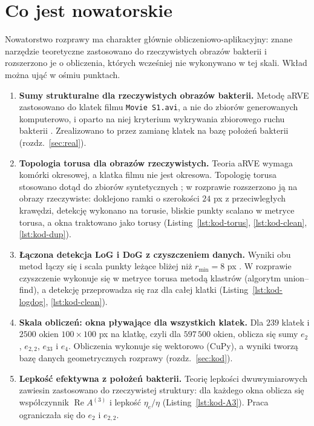 \documentclass[12pt,a4paper,twoside,openright]{report}
\theoremstyle{definition}
\theoremstyle{remark}
\renewcommand{\Re}{\operatorname{Re}}
\begin{document}
{\section{Co jest nowatorskie}
Nowatorstwo rozprawy ma charakter głównie obliczeniowo-aplikacyjny: znane narzędzie teoretyczne zastosowano do rzeczywistych obrazów bakterii i rozszerzono je o obliczenia, których wcześniej nie wykonywano w tej skali. Wkład można ująć w ośmiu punktach.
\begin{enumerate}[nosep]
\item \textbf{Sumy strukturalne dla rzeczywistych obrazów bakterii.} Metodę aRVE zastosowano do klatek filmu \texttt{Movie S1.avi}, a nie do zbiorów generowanych komputerowo, i oparto na niej kryterium wykrywania zbiorowego ruchu bakterii \cite{ligocki2024application,ligocki2025study}. Zrealizowano to przez zamianę klatek na bazę położeń bakterii (rozdz.~\ref{sec:real}).
\item \textbf{Topologia torusa dla obrazów rzeczywistych.} Teoria aRVE wymaga komórki okresowej, a klatka filmu nie jest okresowa. Topologię torusa stosowano dotąd do zbiorów syntetycznych \cite{nawalaniec2020effective}; w rozprawie rozszerzono ją na obrazy rzeczywiste: doklejono ramki o szerokości $24$ px z przeciwległych krawędzi, detekcję wykonano na torusie, bliskie punkty scalano w metryce torusa, a okna traktowano jako torusy (Listing~\ref{lst:kod-torus}, \ref{lst:kod-clean}, \ref{lst:kod-dup}).
\item \textbf{Łączona detekcja LoG i DoG z czyszczeniem danych.} Wyniki obu metod łączy się i scala punkty leżące bliżej niż $r_{\min}=8$ px \cite{ligocki2025study}. W rozprawie czyszczenie wykonuje się w metryce torusa metodą klastrów (algorytm union--find), a detekcję przeprowadza się raz dla całej klatki (Listing~\ref{lst:kod-logdog}, \ref{lst:kod-clean}).
\item \textbf{Skala obliczeń: okna pływające dla wszystkich klatek.} Dla $239$ klatek i $2500$ okien $100\times100$ px na klatkę, czyli dla $597\,500$ okien, oblicza się sumy $e_2$, $e_{2,2}$, $e_{33}$ i $e_4$. Obliczenia wykonuje się wektorowo (CuPy), a wyniki tworzą bazę danych geometrycznych rozprawy (rozdz.~\ref{sec:kod}).
\item \textbf{Lepkość efektywna z położeń bakterii.} Teorię lepkości dwuwymiarowych zawiesin \cite{drygas2019applied} zastosowano do rzeczywistej struktury: dla każdego okna oblicza się współczynnik $\Re A^{(3)}$ i lepkość $\eta_e/\eta$ (Listing~\ref{lst:kod-A3}). Praca \cite{ligocki2025study} ograniczała się do $e_2$ i $e_{2,2}$.

\end{enumerate}}
\end{document}
